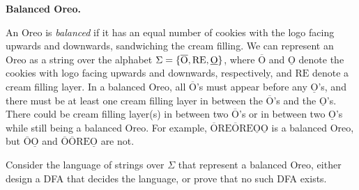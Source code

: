 \documentclass[11pt,addpoints,answers]{exam}
\begin{document}
\begin{questions}
\begin{parts}
    
    \begin{solution}
      \begin{center}
        \end{center}
    \end{solution}
    
\end{parts}
\pagebreak
\question [10] \textbf{Balanced Oreo.}

\newcommand{\upO}{\overline{\text{O}}}
\newcommand{\downO}{\underline{\text{O}}}
\newcommand{\RE}{\text{RE}}

An Oreo is \emph{balanced} if it has an equal number of cookies with the logo facing upwards and downwards, sandwiching the cream filling. We can represent an Oreo as a string over the alphabet $\Sigma = \set{\upO, \RE, \downO}$, where $\upO$ and $\downO$ denote the cookies with logo facing upwards and downwards, respectively, and $\RE$ denote a cream filling layer. In a balanced Oreo, all $\upO$'s must appear before any $\downO$'s, and there must be at least one cream filling layer in between the $\upO$'s and the $\downO$'s. There could be cream filling layer(s) in between two $\upO$'s or in between two $\downO$'s while still being a balanced Oreo. For example, $\upO \RE \upO \RE \downO \downO$ is a balanced Oreo, but $\upO \downO$ and $\upO \upO \RE \downO$ are not. 

Consider the language of strings over $\Sigma$ that represent a balanced Oreo, either design a DFA that decides the language, or prove that no such DFA exists.


\end{questions}
\end{document}
